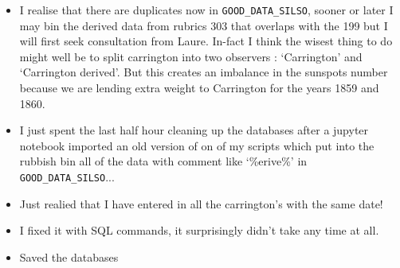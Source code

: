 \documentclass[12pt]{article}
\begin{document}
\begin{itemize}
    \item I realise that there are duplicates now in \texttt{GOOD\_DATA\_SILSO}, sooner or later I may bin the derived data from rubrics 303 that overlaps with the 199 but I will first seek consultation from Laure. In-fact I think the wisest thing to do might well be to split carrington into two observers : `Carrington' and `Carrington derived'. But this creates an imbalance in the sunspots number because we are lending extra weight to Carrington for the years 1859 and 1860.
    \item I just spent the last half hour cleaning up the databases after a jupyter notebook imported an old version of on of my scripts which put into the rubbish bin all of the data with comment like `\%erive\%' in \texttt{GOOD\_DATA\_SILSO}...
    \item Just realied that I have entered in all the carrington's with the same date!
    \item I fixed it with SQL commands, it surprisingly didn't take any time at all.
    \item Saved the databases
\end{itemize}
\end{document}
